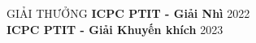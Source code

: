 \documentclass{resume}
\begin{document}
\begin{rSection}{GIẢI THƯỞNG} 
\textbf{ICPC PTIT - Giải Nhì} \hfill 2022\\
\textbf{ICPC PTIT - Giải Khuyến khích} \hfill 2023\\

\end{rSection}
\end{document}
